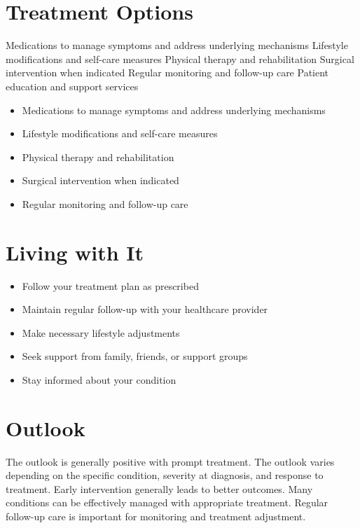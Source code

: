 \section{Treatment Options}
Medications to manage symptoms and address underlying mechanisms Lifestyle modifications and self-care measures Physical therapy and rehabilitation Surgical intervention when indicated Regular monitoring and follow-up care Patient education and support services

\begin{itemize}[noitemsep]
  \item Medications to manage symptoms and address underlying mechanisms
  \item Lifestyle modifications and self-care measures
  \item Physical therapy and rehabilitation
  \item Surgical intervention when indicated
  \item Regular monitoring and follow-up care
\end{itemize}
\section{Living with It}
\begin{itemize}[noitemsep]
  \item Follow your treatment plan as prescribed
  \item Maintain regular follow-up with your healthcare provider
  \item Make necessary lifestyle adjustments
  \item Seek support from family, friends, or support groups
  \item Stay informed about your condition
\end{itemize}
\section{Outlook}
The outlook is generally positive with prompt treatment. The outlook varies depending on the specific condition, severity at diagnosis, and response to treatment. Early intervention generally leads to better outcomes. Many conditions can be effectively managed with appropriate treatment. Regular follow-up care is important for monitoring and treatment adjustment.
